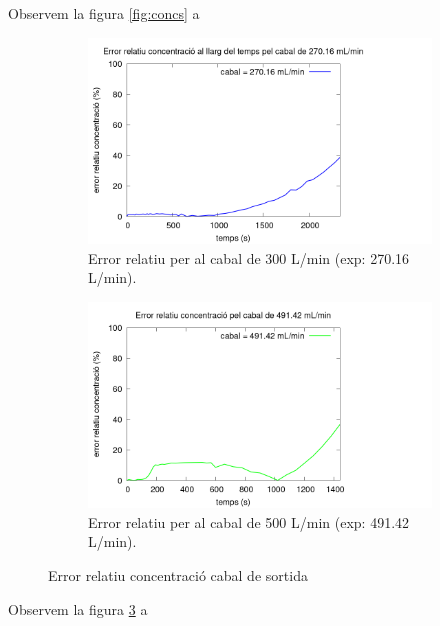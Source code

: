 \documentclass[10pt, twoside]{article}
\begin{document}
Observem la figura \ref{fig:concs} a

\begin{figure}[hbt!]
    \centering
    \begin{subfigure}{0.45\textwidth}
        \centering
        \includegraphics[width=\textwidth]{error300.png}
        \caption{Error relatiu per al cabal de 300 L/min (exp: 270.16 L/min).}
        \label{fig:error300}
    \end{subfigure}
    \hspace{0.025\textwidth}
    \begin{subfigure}{0.45\textwidth}
        \centering
        \includegraphics[width=\textwidth]{error500.png}
        \caption{Error relatiu per al cabal de 500 L/min (exp: 491.42 L/min).}
        \label{fig:error500}
    \end{subfigure}
    \caption{Error relatiu concentració cabal de sortida}
    \label{fig:errors}
\end{figure}

Observem la figura \ref{fig:errors} a
\end{document}
